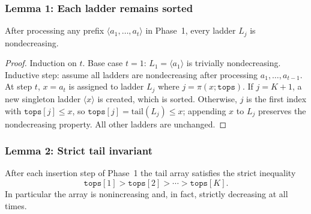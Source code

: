 \documentclass[12pt,a4paper]{article}
\theoremstyle{plain}
\theoremstyle{definition}
\newcommand{\tops}{\texttt{tops}}
\begin{document}
\subsubsection{Lemma 1: Each ladder remains sorted}
\label{lem:ladder_sorted}
After processing any prefix $\langle a_1, \dots, a_t \rangle$ in Phase~1,
every ladder $L_j$ is nondecreasing.


\begin{proof}
Induction on $t$.  Base case $t=1$: $L_1 = \langle a_1 \rangle$ is
trivially nondecreasing.  Inductive step: assume all ladders are
nondecreasing after processing $a_1, \dots, a_{t-1}$.  At step $t$,
$x = a_t$ is assigned to ladder $L_j$ where $j = \pi(x;\tops)$.  If
$j = K+1$, a new singleton ladder $\langle x \rangle$ is created, which
is sorted.  Otherwise, $j$ is the first index with $\tops[j] \le x$, so
$\tops[j] = \mathrm{tail}(L_j) \le x$; appending $x$ to $L_j$ preserves
the nondecreasing property.  All other ladders are unchanged.
\end{proof}

\subsubsection{Lemma 2: Strict tail invariant}
\label{lem:tops_nonincreasing}
After each insertion step of Phase~1 the tail array satisfies the strict
inequality
\[ \tops[1] > \tops[2] > \cdots > \tops[K]. \]
In particular the array is nonincreasing and, in fact, strictly decreasing
at all times.
\end{document}
